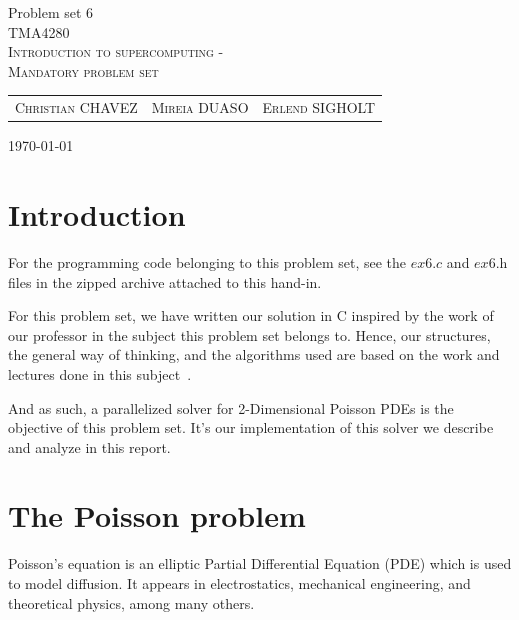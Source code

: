\documentclass[fontsize=11pt,paper=a4,titlepage]{article}
\begin{document}
\begin{center}


{\huge Problem set 6}\\[0.5cm]

\textsc{\LARGE TMA4280}\\[0.5cm]
\textsc{\large Introduction to supercomputing -}\\
\textsc{\large Mandatory problem set}\\[0.6cm]

\begin{table}[h]
\centering
\begin{tabular}{ccc}
	\textsc{Christian CHAVEZ} & \textsc{Mireia DUASO} & \textsc{Erlend SIGHOLT}
\end{tabular}
\end{table}

\large{\today}
\vfill
\end{center}



\clearpage
\section{Introduction}

For the programming code belonging to this problem set, see the $\textit{ex6.c}$
and $\textit{ex6.h}$ files in the zipped archive attached to this hand-in.

For this problem set, we have written our solution in C inspired by the work of
our professor in the subject this problem set belongs to. Hence, our structures,
the general way of thinking, and the algorithms used are based on the work and
lectures done in this subject~\cite{tma4280}.

And as such, a parallelized solver for 2-Dimensional Poisson PDEs is the
objective of this problem set. It's our implementation of this solver we
describe and analyze in this report.


\section{The Poisson problem}
\label{sec:Pois-Prob}

Poisson's equation is an elliptic Partial Differential Equation (PDE) which is
used to model diffusion. It appears in electrostatics, mechanical
engineering, and theoretical physics, among many others.
\end{document}
